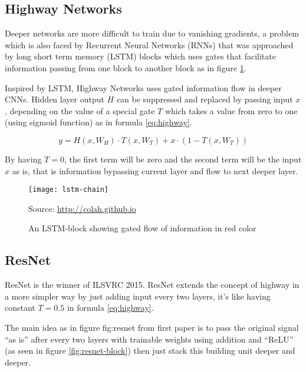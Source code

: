 \subsection{Highway Networks}

Deeper networks are more difficult to train due to vanishing gradients, 
a problem which is also faced by Recurrent Neural Networks (RNNs)
that was approached by long short term memory (LSTM) blocks
which uses gates that facilitate information passing from one block to another block as in figure \ref{fig:lstm-chain}.

Inspired by LSTM, Highway Networks\autocite{srivastava2015highway}\autocite{srivastava2015training} 
uses gated information flow in deeper CNNs. Hidden layer output \(H\)
can be suppressed and replaced by passing input \(x\), depending on the value of
a special gate \(T\) which takes a value from zero to one (using sigmoid function)
as in formula \ref{eq:highway}.

\begin{equation}
y = H(x, W_{H} ) \cdot T (x, W_{T} ) + x \cdot (1 - T (x, W_{T} ))
\label{eq:highway}
\end{equation}

By having \(T=0\), the first term will be zero and the second term will be the input \(x\) as is,
that is information bypassing current layer and flow to next deeper layer.


\begin{figure}[!h]
\centering
\texttt{[image: lstm-chain]}
\caption{An LSTM-block showing gated flow of information in red color}\label{fig:lstm-chain}
{Source: \href{http://colah.github.io/posts/2015-08-Understanding-LSTMs/}{http://colah.github.io}\hfill}
\end{figure}


\subsection{ResNet}

ResNet\autocite{he2016deep}\autocite{he2016identity} is the winner of ILSVRC 2015.
ResNet extends the concept of highway in a more simpler way by just adding input every two layers,
it's like having constant \(T=0.5\) in formula \ref{eq:highway}.

The main idea as in figure {fig:resnet} from first paper\autocite{he2016deep} is to pass the original signal ``as is''
after every two layers with trainable weights using addition and ``ReLU'' (as seen in figure \ref{fig:resnet-block})
then just stack this building unit deeper and deeper.

